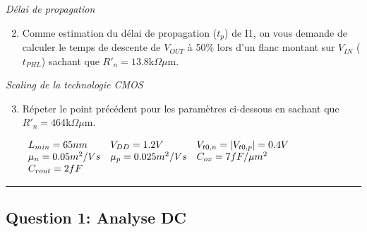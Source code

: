 \documentclass[frenchb,DIV=14]{scrartcl}
\begin{document}
\emph{Délai de propagation}
\begin{enumerate}
	\setcounter{enumi}{1}
	\item Comme estimation du délai de propagation ($t_p$) de I1, on vous demande de
	calculer le temps de descente de $V_{OUT}$ à 50\% lors d'un flanc montant sur $V_{IN}$
	($t_{PHL}$) sachant que $R'_n =13.8$k$\Omega\mu$m.
\end{enumerate}

\emph{Scaling de la technologie CMOS}
\begin{enumerate}
	\setcounter{enumi}{2}
	\item Répeter le point précédent pour les paramètres ci-dessous en sachant que
	$R'_n = 464$k$\Omega\mu$m.

	\begin{center}
	$
		\begin{array}{l l l}
			L_{min} = 65 nm 		& V_{DD} = 1.2V 		&V_{t0,n} = |V_{t0,p}| = 0.4V \\
			\mu_n = 0.05 m^2/Vs 	& \mu_p= 0.025 m^2/Vs	& C_{ox} = 7 fF/\mu m^2 \\
			C_{rout} = 2fF			&						& \\
		\end{array}
	$
	\end{center}
\end{enumerate}

\hspace{1cm}\hrule

\subsection*{Question 1: Analyse DC}
\end{document}
